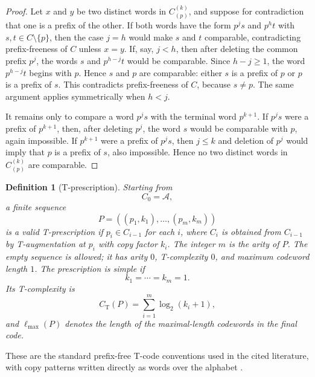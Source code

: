 \documentclass[11pt]{article}
\newtheorem{definition}{Definition}
\newcommand{\A}{\mathcal A}
\newcommand{\CT}{C_{\mathrm T}}
\newcommand{\ellmax}{\ell_{\max}}
\begin{document}
\begin{proof}
Let $x$ and $y$ be two distinct words in $C_{(p)}^{(k)}$, and suppose for contradiction that one is a prefix of the other. If both words have the form $p^j s$ and $p^h t$ with $s,t\in C\setminus\{p\}$, then the case $j=h$ would make $s$ and $t$ comparable, contradicting prefix-freeness of $C$ unless $x=y$. If, say, $j<h$, then after deleting the common prefix $p^j$, the words $s$ and $p^{h-j}t$ would be comparable. Since $h-j\geq 1$, the word $p^{h-j}t$ begins with $p$. Hence $s$ and $p$ are comparable: either $s$ is a prefix of $p$ or $p$ is a prefix of $s$. This contradicts prefix-freeness of $C$, because $s\neq p$. The same argument applies symmetrically when $h<j$.

It remains only to compare a word $p^j s$ with the terminal word $p^{k+1}$. If $p^j s$ were a prefix of $p^{k+1}$, then, after deleting $p^j$, the word $s$ would be comparable with $p$, again impossible. If $p^{k+1}$ were a prefix of $p^j s$, then $j\leq k$ and deletion of $p^j$ would imply that $p$ is a prefix of $s$, also impossible. Hence no two distinct words in $C_{(p)}^{(k)}$ are comparable.
\end{proof}

\begin{definition}[T-prescription]
Starting from
\begin{equation}
C_0=\A,
\end{equation}
a finite sequence
\begin{equation}
P=((p_1,k_1),\ldots,(p_m,k_m))
\end{equation}
is a valid T-prescription if $p_i\in C_{i-1}$ for each $i$, where $C_i$ is obtained from $C_{i-1}$ by T-augmentation at $p_i$ with copy factor $k_i$. The integer $m$ is the arity of $P$. The empty sequence is allowed; it has arity $0$, T-complexity $0$, and maximum codeword length $1$. The prescription is simple if
\begin{equation}
k_1=\cdots=k_m=1.
\end{equation}
Its T-complexity is
\begin{equation}
\CT(P)=\sum_{i=1}^{m}\log_2(k_i+1),
\end{equation}
and $\ellmax(P)$ denotes the length of the maximal-length codewords in the final code.
\end{definition}

These are the standard prefix-free T-code conventions used in the cited literature, with copy patterns written directly as words over the alphabet \cite{TitchenerEtAl2005,NicolescuTitchener1998}.
\end{document}

